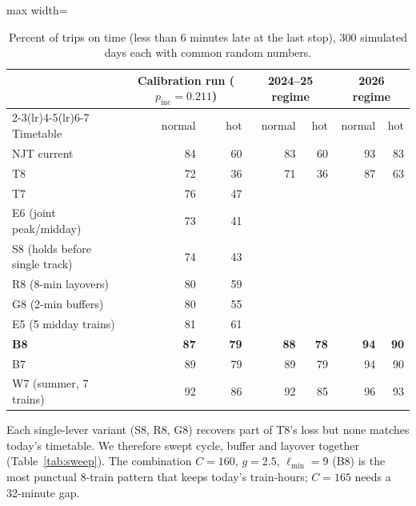 \documentclass[11pt]{article}
\begin{document}
\begin{table}[ht]\centering\small
\begin{adjustbox}{max width=\linewidth}
\begin{tabular}{@{}lrrrrrr@{}}
\toprule
& \multicolumn{2}{c}{Calibration run ($p_{\text{inc}}=0.211$)} & \multicolumn{2}{c}{2024--25 regime} & \multicolumn{2}{c}{2026 regime} \\
\cmidrule(lr){2-3}\cmidrule(lr){4-5}\cmidrule(lr){6-7}
Timetable & normal & hot & normal & hot & normal & hot \\ \midrule
NJT current & 84 & 60 & 83 & 60 & 93 & 83 \\
T8 & 72 & 36 & 71 & 36 & 87 & 63 \\
T7 & 76 & 47 & & & & \\
E6 (joint peak/midday) & 73 & 41 & & & & \\
S8 (holds before single track) & 74 & 43 & & & & \\
R8 (8-min layovers) & 80 & 59 & & & & \\
G8 (2-min buffers) & 80 & 55 & & & & \\
E5 (5 midday trains) & 81 & 61 & & & & \\
\textbf{B8} & \textbf{87} & \textbf{79} & \textbf{88} & \textbf{78} & \textbf{94} & \textbf{90} \\
B7 & 89 & 79 & 89 & 79 & 94 & 90 \\
W7 (summer, 7 trains) & 92 & 86 & 92 & 85 & 96 & 93 \\
\bottomrule
\end{tabular}
\end{adjustbox}
\caption{Percent of trips on time (less than 6 minutes late at the last stop), 300 simulated days each with common random numbers.}\label{tab:delay}
\end{table}

Each single-lever variant (S8, R8, G8) recovers part of T8's loss but none matches today's timetable. We therefore swept cycle, buffer and layover together (Table~\ref{tab:sweep}). The combination $C=160$, $g=2.5$, $\ell_{\min}=9$ (B8) is the most punctual 8-train pattern that keeps today's train-hours; $C=165$ needs a 32-minute gap.
\end{document}

